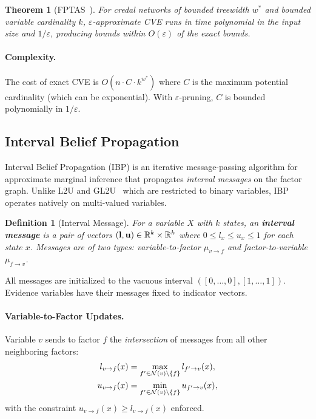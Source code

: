 \documentclass{article}
\newtheorem{definition}{Definition}
\newtheorem{theorem}{Theorem}
\begin{document}
\begin{theorem}[FPTAS~\cite{maua2012anytime}]
For credal networks of bounded treewidth $w^*$ and bounded variable cardinality $k$,
$\varepsilon$-approximate CVE runs in time polynomial in the input size and $1/\varepsilon$, producing bounds within $O(\varepsilon)$ of the exact bounds.
\end{theorem}

\paragraph{Complexity.} The cost of exact CVE is $O(n \cdot C \cdot k^{w^*})$ where $C$ is the maximum potential cardinality (which can be exponential). With $\varepsilon$-pruning, $C$ is bounded polynomially in $1/\varepsilon$.


\subsection{Interval Belief Propagation}
\label{sec-ibp}

Interval Belief Propagation (IBP) is an iterative message-passing algorithm for approximate marginal inference that propagates \emph{interval messages} on the factor graph. Unlike L2U and GL2U~\cite{ide2014credal} which are restricted to binary variables, IBP operates natively on multi-valued variables.

\begin{definition}[Interval Message]
For a variable $X$ with $k$ states, an \textbf{interval message} is a pair of vectors $(\mathbf{l}, \mathbf{u}) \in \mathbb{R}^k \times \mathbb{R}^k$ where $0 \leq l_x \leq u_x \leq 1$ for each state $x$. Messages are of two types: variable-to-factor $\mu_{v \to f}$ and factor-to-variable $\mu_{f \to v}$.
\end{definition}

All messages are initialized to the vacuous interval $([0, \dots, 0], [1, \dots, 1])$. Evidence variables have their messages fixed to indicator vectors.

\paragraph{Variable-to-Factor Updates.} Variable $v$ sends to factor $f$ the \emph{intersection} of messages from all other neighboring factors:
\begin{align*}
  l_{v \to f}(x) &= \max_{f' \in \mathcal{N}(v) \setminus \{f\}} l_{f' \to v}(x), \\
  u_{v \to f}(x) &= \min_{f' \in \mathcal{N}(v) \setminus \{f\}} u_{f' \to v}(x),
\end{align*}
with the constraint $u_{v \to f}(x) \geq l_{v \to f}(x)$ enforced.
\end{document}
